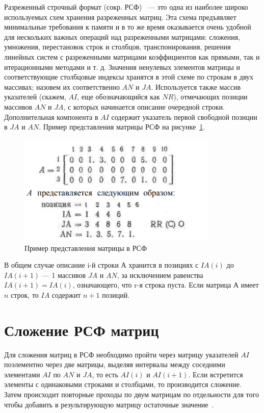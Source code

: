 Разреженный строчный формат (сокр. РСФ)~\cite{csr} --- это одна из наиболее широко используемых схем хранения разреженных матриц.
Эта схема предъявляет минимальные требования к памяти и в то же
время оказывается очень удобной для нескольких важных операций над разреженными матрицами: сложения, умножения,
перестановок строк и столбцов, транспонирования, решения линейных систем с разреженными матрицами коэффициентов как
прямыми, так и итерационными методами и т. д. 
Значения ненулевых элементов матрицы и соответствующие столбцовые индексы хранятся в этой схеме по строкам в двух массивах; назовем их соответственно $AN$ и $JA$. 
Используется также массив указателей (скажем, $AI$, еще обозначающийся как $NR$), отмечающих позиции массивов $AN$ и $JA$, с которых начинается описание очередной строки. Дополнительная компонента в $AI$ содержит указатель первой свободной позиции в $JA$ и $AN$. 
Пример представления матрицы РСФ на рисунке~\ref{fig:ex-csr}.

\begin{figure}[h]
	\centering
	\includegraphics[width=0.85\textwidth]{img/example_csr.png}
	\caption{Пример представления матрицы в РСФ}
	\label{fig:ex-csr}
\end{figure}

В общем случае описание i-й строки $А$ хранится в позициях с $IA(i)$ до $IA(i + 1)$ --- 1 массивов $JA$ и $AN$, за исключением
равенства $IA(i + 1) = IA(i)$, означающего, что r-я строка пуста.
Если матрица $А$ имеет $n$ строк, то $IA$ содержит $n + 1$ позиций. 

\section{Сложение РСФ матриц}

Для сложения матриц в РСФ необходимо пройти через матрицу указателей $AI$ поэлементно через две матрицы, выделяя интервалы между соседними элементами $AI$ по $AN$ и $JA$, то есть $AI(i)$ и $AI(i + 1)$.
Если встретится элементы с одинаковыми строками и столбцами, то производится сложение. Затем происходит повторные проходы по двум матрицам  по отдельности для того чтобы добавить в результирующую матрицу остаточные значение~\cite{csr}.

